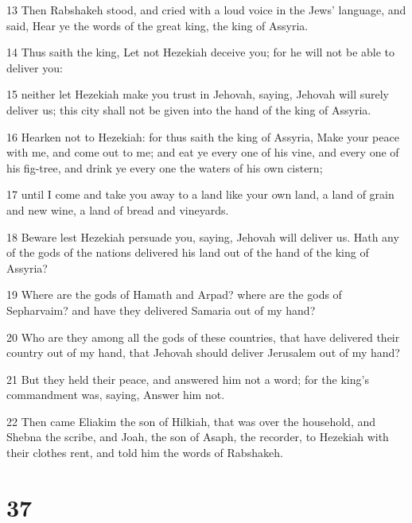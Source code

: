 \par 13 Then Rabshakeh stood, and cried with a loud voice in the Jews' language, and said, Hear ye the words of the great king, the king of Assyria.
\par 14 Thus saith the king, Let not Hezekiah deceive you; for he will not be able to deliver you:
\par 15 neither let Hezekiah make you trust in Jehovah, saying, Jehovah will surely deliver us; this city shall not be given into the hand of the king of Assyria.
\par 16 Hearken not to Hezekiah: for thus saith the king of Assyria, Make your peace with me, and come out to me; and eat ye every one of his vine, and every one of his fig-tree, and drink ye every one the waters of his own cistern;
\par 17 until I come and take you away to a land like your own land, a land of grain and new wine, a land of bread and vineyards.
\par 18 Beware lest Hezekiah persuade you, saying, Jehovah will deliver us. Hath any of the gods of the nations delivered his land out of the hand of the king of Assyria?
\par 19 Where are the gods of Hamath and Arpad? where are the gods of Sepharvaim? and have they delivered Samaria out of my hand?
\par 20 Who are they among all the gods of these countries, that have delivered their country out of my hand, that Jehovah should deliver Jerusalem out of my hand?
\par 21 But they held their peace, and answered him not a word; for the king's commandment was, saying, Answer him not.
\par 22 Then came Eliakim the son of Hilkiah, that was over the household, and Shebna the scribe, and Joah, the son of Asaph, the recorder, to Hezekiah with their clothes rent, and told him the words of Rabshakeh.

\chapter{37}

